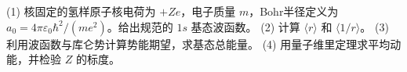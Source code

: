 (1) 核固定的氢样原子核电荷为 \(+Ze\)，电子质量 \(m\)，Bohr半径定义为 \(a_0=4\pi\varepsilon_0\hbar^2/(me^2)\)。给出规范的 \(1s\) 基态波函数。
(2) 计算 \(\langle r\rangle\) 和 \(\langle1/r\rangle\)。
(3) 利用波函数与库仑势计算势能期望，求基态总能量。
(4) 用量子维里定理求平均动能，并检验 \(Z\) 的标度。
